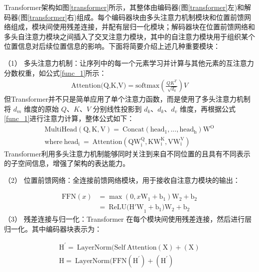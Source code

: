 \documentclass[UTF8,a4paper,12pt]{ctexart}
\numberwithin{equation}{section}
\begin{document}
Transformer架构如图\ref{transformer}所示，其整体由编码器(图\ref{transformer}左)和解码器(图\ref{transformer}右)组成。每个编码器块由多头注意力机制模块和位置前馈网络组成，模块间使用残差连接，并配有层归一化模块；解码器块在位置前馈网络和多头自注意力模块之间插入了交叉注意力模块，其中的自注意力模块用于组织某个位置信息对后续位置信息的影响。下面将简要介绍上述几种重要模块：\par
（1） 多头注意力机制：让序列中的每一个元素学习并计算与其他元素的互注意力分数权重，如公式\ref{func_1}所示：
\begin{eqnarray}
	\text{Attention(Q,K,V)} =  \text{softmax}(\frac{QK^T}{\sqrt[]{d_k}})V
	\label{func_1}
\end{eqnarray}
但Transformer并不只是简单应用了单个注意力函数，而是使用了多头注意力机制将 \(d_m\) 维度的原始 \(Q\)、\(K\)、\(V\) 分别线性投影到 \(d_k\)、\(d_k\)、\(d_v\) 维度，再根据公式\ref{func_1}进行注意力计算，整体公式如下：
\begin{eqnarray}
	\mathrm{MultiHead(Q,K,V)=~Concat(head_{1},...,head_{h})W^{O}} \\
	\mathrm{where~head_{i}~=~Attention(QW_{i}^{Q},KW_{i}^{K},VW_{i}^{V})}
	\label{func_2}
\end{eqnarray}
Transformer利用多头注意力机制能够同时关注到来自不同位置的且具有不同表示的子空间信息，增强了架构的表达能力。\par
（2） 位置前馈网络：全连接前馈网络模块，用于接收自注意力模块的输出：\par
\begin{eqnarray}
\mathrm{FFN}(x) & =\max(0,x\mathrm{W}_1+\mathrm{b}_1)\mathrm{W}_2+\mathrm{b}_2 \\
& =\mathrm{~ReLU(H'W}_1+\mathrm{b}_1)\mathrm{W}_2+\mathrm{b}_2
\label{func_3}
\end{eqnarray}
（3） 残差连接与归一化：Transformer 在每个模块间使用残差连接，然后进行层归一化。其中编码器块表示为：\par
\begin{eqnarray}
	\mathrm{H^{\prime}=~LayerNorm(Self~Attention(X)+(X)} \\
	\mathrm{H=~LayerNorm(FFN(H^{\prime})+(H^{\prime})}
	\label{func_4}
\end{eqnarray}
\end{document}
